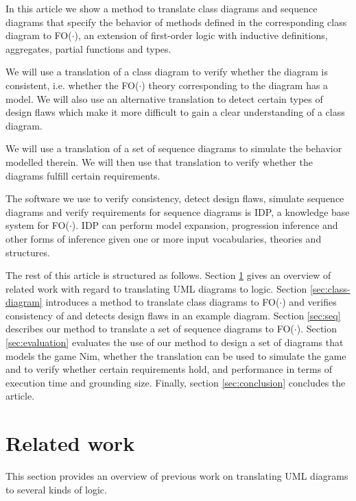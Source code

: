 \documentclass[conference]{IEEEtran}
\begin{document}
In this article we show a method to translate class diagrams and sequence diagrams that specify the behavior of methods defined in the corresponding class diagram to FO($\cdot$)\cite{DeCatBroes2014PLaa}, an extension of first-order logic with inductive definitions, aggregates, partial functions and types.

We will use a translation of a class diagram to verify whether the diagram is consistent, i.e. whether the FO($\cdot$) theory corresponding to the diagram has a model. We will also use an alternative translation to detect certain types of design flaws which make it more difficult to gain a clear understanding of a class diagram.

We will use a translation of a set of sequence diagrams to simulate the behavior modelled therein. We will then use that translation to verify whether the diagrams fulfill certain requirements.

The software we use to verify consistency, detect design flaws, simulate sequence diagrams and verify requirements for sequence diagrams is IDP\cite{DeCatBroes2014PLaa}, a knowledge base system for FO($\cdot$). IDP can perform model expansion, progression inference and other forms of inference given one or more input vocabularies, theories and structures. 

The rest of this article is structured as follows. Section \ref{sec:related-work} gives an overview of related work with regard to translating UML diagrams to logic. Section \ref{sec:class-diagram} introduces a method to translate class diagrams to FO($\cdot$) and verifies consistency of and detects design flaws in an example diagram. Section \ref{sec:seq} describes our method to translate a set of sequence diagrams to FO($\cdot$). Section \ref{sec:evaluation} evaluates the use of our method to design a set of diagrams that models the game Nim, whether the translation can be used to simulate the game and to verify whether certain requirements hold, and performance in terms of execution time and grounding size. Finally, section \ref{sec:conclusion} concludes the article.

\section{Related work}\label{sec:related-work}

This section provides an overview of previous work on translating UML diagrams to several kinds of logic.
\end{document}
